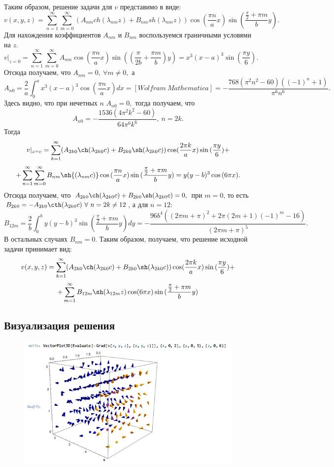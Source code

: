 \documentclass[11pt]{article}
\begin{document}
Таким образом, решение задачи для $v$ представимо в виде:
$$v(x,y,z)=\sum_{n=1}^\infty \sum_{m=0}^\infty(A_{nm}ch(\lambda_{nm}z)+B_{nm}sh(\lambda_{nm}z))\cos{(\frac{\pi n}{a}x)}\sin{(\frac{\frac{\pi}{2}+\pi m}{b}y)}.$$
Для нахождения коэффициентов $A_{nm}$ и $B_{nm}$ воспользуемся граничными условями на $z$.
$$v|_{z=0}=\sum_{n=1}^\infty \sum_{m=0}^\infty A_{nm}\cos{(\frac{\pi n}{a}x)}\sin{((\frac{\pi}{2b}+\frac{\pi m}{b})y)}=x^3(x-a)^3\sin{(\frac{\pi y}{6})}.$$
Отсюда получаем, что $A_{nm}=0,\ \forall m \neq 0,$ а $$A_{n0}=\frac{2}{a}\int_0^a x^3(x-a)^3 \cos(\frac{\pi n}{a}x)dx=[Wolfram\  Mathematica]=-\frac{768 \left(\pi ^2 n^2-60\right) ((-1)^n+1)}{\pi ^6 n^6}.$$ Здесь видно, что при нечетных $n$ $A_{n0}=0,$ тогда получаем, что 
$$A_{n0}=-\frac{1536 \left(4\pi ^2 k^2-60\right)}{64\pi ^6 k^6},\ n=2k.$$
Тогда
$$v|_{z=c}=\sum_{k=1}^\infty (A_{2k0}\ch(\lambda_{2k0}c)+B_{2k0}\sh(\lambda_{2k0} c))\cos(\frac{2\pi k}{a}x)\sin{(\frac{\pi y}{6})}+$$
$$+\sum_{n=1}^\infty \sum_{m=0}^\infty B_{nm}\sh{(\lambda_{nm} c)}\cos{(\frac{\pi n}{a}x)}\sin{(\frac{\frac{\pi}{2}+\pi m}{b}y)}=y(y-b)^3\cos{({6\pi x})}.$$
Отсюда получаем, что $A_{2k0}\ch(\lambda_{2k0}c)+B_{2k0}\sh(\lambda_{2k0} c)=0,$ при $m=0$, то есть $B_{2k0}=-A_{2k0}\cth(\lambda_{2k0}c)\ \forall\ n=2k \neq 12$, а для $n=12$: 
$$B_{12m}=\frac{2}{b}\int_0^by(y-b)^3\sin{(\frac{\frac{\pi}{2}+\pi m}{b}y)}dy=-\frac{96 b^4 \left((2 \pi  m+\pi )^2+2 \pi  (2 m+1)(-1)^m-16\right)}{(2 \pi  m+\pi )^5}.$$
В остальных случаях $B_{nm}=0$.
Таким образом, получаем, что решение исходной задачи принимает вид:
$$v(x,y,z)=\sum_{k=1}^\infty (A_{2k0}\ch(\lambda_{2k0}c)+B_{2k0}\sh(\lambda_{2k0} c))\cos(\frac{2\pi k}{a}x)\sin{(\frac{\pi y}{6})}+$$
$$+\sum_{m=1}^\infty B_{12m}\sh(\lambda_{12m}z)\cos(6\pi x)\sin{(\frac{\frac{\pi}{2}+\pi m}{b}y)}$$

\subsection*{Визуализация решения}
\begin{figure}
    \centering
    \includegraphics[width=1\linewidth]{image2.png}
\end{figure}
\end{document}
